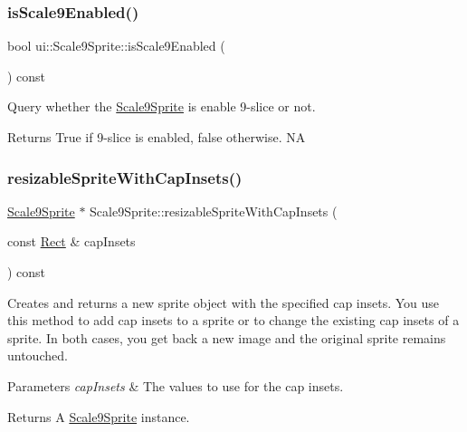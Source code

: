 \subsubsection{\texorpdfstring{is\+Scale9\+Enabled()}{isScale9Enabled()}\hspace{0.1cm}{\footnotesize\ttfamily [2/2]}}
{\footnotesize\ttfamily bool ui\+::\+Scale9\+Sprite\+::is\+Scale9\+Enabled (\begin{DoxyParamCaption}{ }\end{DoxyParamCaption}) const}



Query whether the \hyperlink{classui_1_1Scale9Sprite}{Scale9\+Sprite} is enable 9-\/slice or not. 

\begin{DoxyReturn}{Returns}
True if 9-\/slice is enabled, false otherwise.  NA 
\end{DoxyReturn}
\mbox{\label{classui_1_1Scale9Sprite_a0ef84c5db252c4f7efef277e8afb75a4}} 
\subsubsection{\texorpdfstring{resizable\+Sprite\+With\+Cap\+Insets()}{resizableSpriteWithCapInsets()}\hspace{0.1cm}{\footnotesize\ttfamily [1/2]}}
{\footnotesize\ttfamily \hyperlink{classui_1_1Scale9Sprite}{Scale9\+Sprite} $\ast$ Scale9\+Sprite\+::resizable\+Sprite\+With\+Cap\+Insets (\begin{DoxyParamCaption}\item[{const \hyperlink{classRect}{Rect} \&}]{cap\+Insets }\end{DoxyParamCaption}) const}

Creates and returns a new sprite object with the specified cap insets. You use this method to add cap insets to a sprite or to change the existing cap insets of a sprite. In both cases, you get back a new image and the original sprite remains untouched.


\begin{DoxyParams}{Parameters}
{\em cap\+Insets} & The values to use for the cap insets. \\
\hline
\end{DoxyParams}
\begin{DoxyReturn}{Returns}
A \hyperlink{classui_1_1Scale9Sprite}{Scale9\+Sprite} instance. 
\end{DoxyReturn}
\mbox{\label{classui_1_1Scale9Sprite_a8ebd4f16a7d9014560e36642a93c6568}} 
